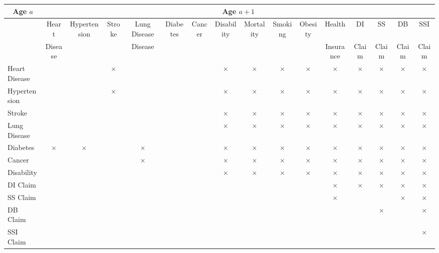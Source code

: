 \begin{tabular}{l|ccccccccccccccc} \toprule
\multicolumn{1}{c}{Age $a$} & \multicolumn{15}{c}{Age $a+1$} \\ \midrule
  & Heart & Hypertension & Stroke & Lung Disease & Diabetes & Cancer & Disability & Mortality & Smoking & Obesity & Health  & DI  & SS  & DB  & SSI  \\
&  Disease &  &  & Disease & & & & &  &  & Insurance & Claim & Claim & Claim & Claim \\
Heart Disease & & & $\times$& & & &$\times$ &$\times$ &$\times$ &     $\times$        &  $\times$      &  $\times$  & $\times$ & $\times$ & $\times$\\
Hypertension  & & & $\times$ & & & &$\times$ &$\times$ &$\times$ &         $\times$    &   $\times$    & $\times$   & $\times$ & $\times$ & $\times$ \\
Stroke           & & & & & & &$\times$ &$\times$ &$\times$ &       $\times$       &     $\times$   &   $\times$  & $\times$ & $\times$ & $\times$ \\
Lung Disease & & & & & & &$\times$ &$\times$ & $\times$&       $\times$      &   $\times$     &   $\times$  &$\times$  & $\times$ & $\times$ \\
Diabetes       & $\times$ &$\times$  & &  $\times$ & & &$\times$ &$\times$ & $\times$&         $\times$    &   $\times$     &  $\times$   & $\times$ & $\times$ & $\times$ \\
Cancer         & & & &  $\times$ & & &$\times$ & $\times$& $\times$&     $\times$       &   $\times$      &   $\times$  & $\times$ & $\times$ & $\times$ \\
Disability     & & & & & & &$\times$ &$\times$ & $\times$&     $\times$       &    $\times$     &     $\times$  & $\times$ & $\times$ & $\times$ \\
\midrule
DI Claim      & & & & &  & & & & &            &    $\times$     & $\times$      & $\times$ & $\times$ & $\times$ \\
SS Claim     & & & & & & & & &           &         &    $\times$  & & & $\times$ & $\times$\\
DB Claim    & & & & &&  & & & &         &        &      & $\times$ & & $\times$ \\
SSI Claim   & & & & &&  & & & &         &        &      & & & $\times$ \\ \bottomrule
\end{tabular}